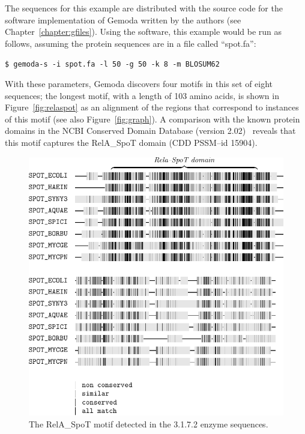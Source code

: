     The sequences for this example are distributed with the source
    code for the software implementation of Gemoda written by the
    authors (see Chapter~\vref{chapter:gfiles}).  Using the
    software, this example would be run as follows, assuming the protein sequences are in
    a file called ``spot.fa'':

    \bigskip
    \begin{center}
    \texttt{\$ gemoda-s -i spot.fa -l 50 -g 50 -k 8 -m BLOSUM62}
    \end{center}
    \bigskip

    With these parameters, Gemoda discovers four motifs
    in this set of eight sequences; the longest motif,
    with a length of 103 amino acids, is shown in
    Figure~\vref{fig:relaspot} as an alignment of the
    regions that correspond to instances of this motif
    (see also Figure~\ref{fig:graph}).
    A comparison with the known protein domains
    in the NCBI Conserved Domain Database (version
    2.02)~\citep{marchler2003cdd} reveals that this
    motif captures the RelA\_SpoT domain (CDD PSSM--id
    15904).


    \begin{figure}[ptb]
        \centering
        \includegraphics[width=\textwidth]{Body/Images-chap3/spot.pdf}
        \caption{The RelA\_SpoT motif detected in the 3.1.7.2 enzyme sequences.}\label{fig:relaspot}
    \end{figure}


